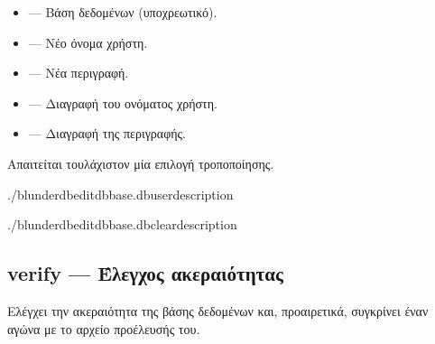 \documentclass[letterpaper,10pt,greek]{sphinxmanual}
\begin{document}
\sphinxAtStartPar
{}
\begin{itemize}
\item {} 
\sphinxAtStartPar
{} — Βάση δεδομένων (υποχρεωτικό).

\item {} 
\sphinxAtStartPar
{} — Νέο όνομα χρήστη.

\item {} 
\sphinxAtStartPar
{} — Νέα περιγραφή.

\item {} 
\sphinxAtStartPar
{} — Διαγραφή του ονόματος χρήστη.

\item {} 
\sphinxAtStartPar
{} — Διαγραφή της περιγραφής.

\end{itemize}

\sphinxAtStartPar
Απαιτείται τουλάχιστον μία επιλογή τροποποίησης.

\sphinxAtStartPar
{}

\begin{sphinxVerbatim}[commandchars=\\\{\}]
./blunderdbedit\PYGZhy{}\PYGZhy{}dbbase.db\PYGZhy{}\PYGZhy{}user\PYGZhy{}\PYGZhy{}description

./blunderdbedit\PYGZhy{}\PYGZhy{}dbbase.db\PYGZhy{}\PYGZhy{}clear\PYGZhy{}description
\end{sphinxVerbatim}


\subsection{verify — Έλεγχος ακεραιότητας}
\label{\detokenize{cli:verify-verifier-l-integrite}}
\sphinxAtStartPar
Ελέγχει την ακεραιότητα της βάσης δεδομένων και, προαιρετικά, συγκρίνει έναν αγώνα με το αρχείο προέλευσής του.
\end{document}
